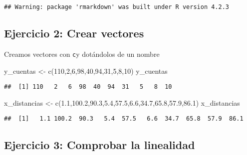 \documentclass[
]{article}
\newenvironment{Shaded}{\begin{snugshade}}{\end{snugshade}}
\newcommand{\DecValTok}[1]{\textcolor[rgb]{0.00,0.00,0.81}{#1}}
\newcommand{\FloatTok}[1]{\textcolor[rgb]{0.00,0.00,0.81}{#1}}
\newcommand{\FunctionTok}[1]{\textcolor[rgb]{0.00,0.00,0.00}{#1}}
\newcommand{\NormalTok}[1]{#1}
\newcommand{\OtherTok}[1]{\textcolor[rgb]{0.56,0.35,0.01}{#1}}
\begin{document}
\begin{verbatim}
## Warning: package 'rmarkdown' was built under R version 4.2.3
\end{verbatim}

\hypertarget{ejercicio-2-crear-vectores}{%
\subsection{Ejercicio 2: Crear
vectores}\label{ejercicio-2-crear-vectores}}

Creamos vectores con \texttt{c}y dotándolos de un nombre

\begin{Shaded}
\begin{Highlighting}[]
\NormalTok{y\_cuentas }\OtherTok{\textless{}{-}} \FunctionTok{c}\NormalTok{(}\DecValTok{110}\NormalTok{,}\DecValTok{2}\NormalTok{,}\DecValTok{6}\NormalTok{,}\DecValTok{98}\NormalTok{,}\DecValTok{40}\NormalTok{,}\DecValTok{94}\NormalTok{,}\DecValTok{31}\NormalTok{,}\DecValTok{5}\NormalTok{,}\DecValTok{8}\NormalTok{,}\DecValTok{10}\NormalTok{)}
\NormalTok{y\_cuentas}
\end{Highlighting}
\end{Shaded}

\begin{verbatim}
##  [1] 110   2   6  98  40  94  31   5   8  10
\end{verbatim}

\begin{Shaded}
\begin{Highlighting}[]
\NormalTok{x\_distancias }\OtherTok{\textless{}{-}} \FunctionTok{c}\NormalTok{(}\FloatTok{1.1}\NormalTok{,}\FloatTok{100.2}\NormalTok{,}\FloatTok{90.3}\NormalTok{,}\FloatTok{5.4}\NormalTok{,}\FloatTok{57.5}\NormalTok{,}\FloatTok{6.6}\NormalTok{,}\FloatTok{34.7}\NormalTok{,}\FloatTok{65.8}\NormalTok{,}\FloatTok{57.9}\NormalTok{,}\FloatTok{86.1}\NormalTok{)}
\NormalTok{x\_distancias}
\end{Highlighting}
\end{Shaded}

\begin{verbatim}
##  [1]   1.1 100.2  90.3   5.4  57.5   6.6  34.7  65.8  57.9  86.1
\end{verbatim}

\hypertarget{ejercicio-3-comprobar-la-linealidad}{%
\subsection{Ejercicio 3: Comprobar la
linealidad}\label{ejercicio-3-comprobar-la-linealidad}}
\end{document}
